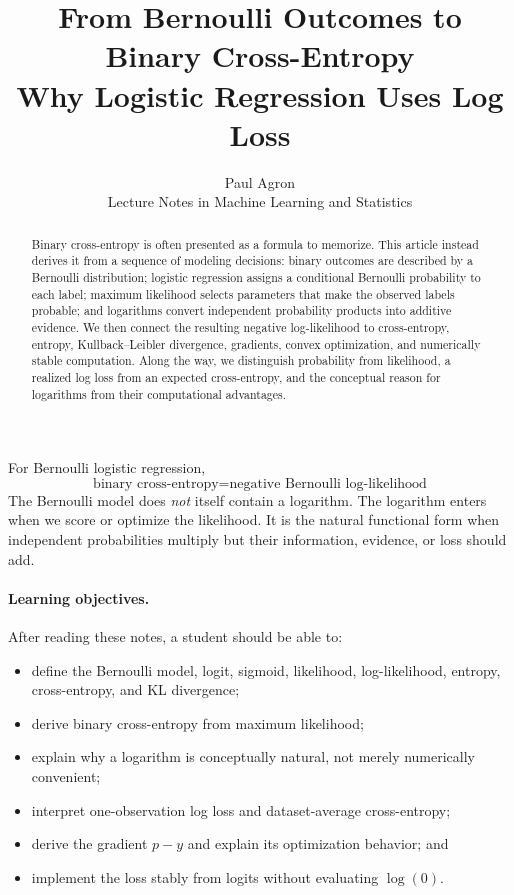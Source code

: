 \documentclass[11pt]{article}
\title{\vspace{-1.5cm}\textbf{From Bernoulli Outcomes to Binary Cross-Entropy}\\[4pt]
\large Why Logistic Regression Uses Log Loss}
\author{Paul Agron\\[3pt]\normalsize Lecture Notes in Machine Learning and Statistics}
\date{}
\theoremstyle{definition}
\begin{document}
\maketitle

\begin{abstract}
Binary cross-entropy is often presented as a formula to memorize. This article instead derives it from a sequence of modeling decisions: binary outcomes are described by a Bernoulli distribution; logistic regression assigns a conditional Bernoulli probability to each label; maximum likelihood selects parameters that make the observed labels probable; and logarithms convert independent probability products into additive evidence. We then connect the resulting negative log-likelihood to cross-entropy, entropy, Kullback--Leibler divergence, gradients, convex optimization, and numerically stable computation. Along the way, we distinguish probability from likelihood, a realized log loss from an expected cross-entropy, and the conceptual reason for logarithms from their computational advantages.
\end{abstract}

\vspace{0.75em}

\begin{keyidea}
For Bernoulli logistic regression,
\[
\boxed{\text{binary cross-entropy}
=\text{negative Bernoulli log-likelihood}}
\]
The Bernoulli model does \emph{not} itself contain a logarithm. The logarithm enters when we score or optimize the likelihood. It is the natural functional form when independent probabilities multiply but their information, evidence, or loss should add.
\end{keyidea}

\paragraph{Learning objectives.}
After reading these notes, a student should be able to:
\begin{itemize}
  \item define the Bernoulli model, logit, sigmoid, likelihood, log-likelihood, entropy, cross-entropy, and KL divergence;
  \item derive binary cross-entropy from maximum likelihood;
  \item explain why a logarithm is conceptually natural, not merely numerically convenient;
  \item interpret one-observation log loss and dataset-average cross-entropy;
  \item derive the gradient $p-y$ and explain its optimization behavior; and
  \item implement the loss stably from logits without evaluating $\log(0)$.
\end{itemize}
\end{document}

